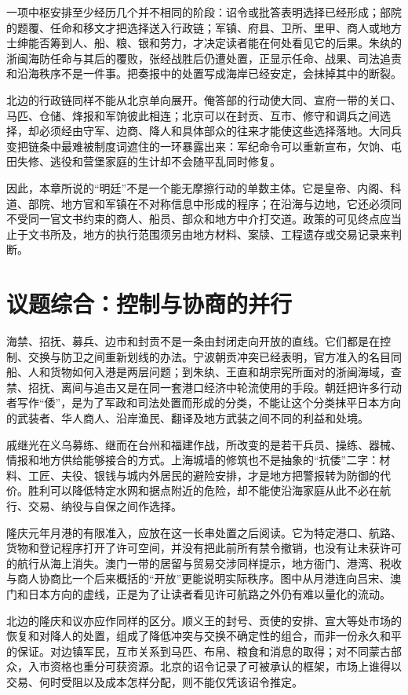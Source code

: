 一项中枢安排至少经历几个并不相同的阶段：诏令或批答表明选择已经形成；部院的题覆、任命和移文才把选择送入行政链；军镇、府县、卫所、里甲、商人或地方士绅能否筹到人、船、粮、银和劳力，才决定读者能在何处看见它的后果。朱纨的浙闽海防任命与其后的覆败，张经战胜后仍遭处置，正显示任命、战果、司法追责和沿海秩序不是一件事。把奏报中的处置写成海岸已经安定，会抹掉其中的断裂。

北边的行政链同样不能从北京单向展开。俺答部的行动使大同、宣府一带的关口、马匹、仓储、烽报和军饷彼此相连；北京可以在封贡、互市、修守和调兵之间选择，却必须经由守军、边商、降人和具体部众的往来才能使这些选择落地。大同兵变把链条中最难被制度词遮住的一环暴露出来：军纪命令可以重新宣布，欠饷、屯田失修、逃役和营堡家庭的生计却不会随平乱同时修复。

因此，本章所说的“明廷”不是一个能无摩擦行动的单数主体。它是皇帝、内阁、科道、部院、地方官和军镇在不对称信息中形成的程序；在沿海与边地，它还必须同不受同一官文书约束的商人、船员、部众和地方中介打交道。政策的可见终点应当止于文书所及，地方的执行范围须另由地方材料、案牍、工程遗存或交易记录来判断。

\section{议题综合：控制与协商的并行}

海禁、招抚、募兵、边市和封贡不是一条由封闭走向开放的直线。它们都是在控制、交换与防卫之间重新划线的办法。宁波朝贡冲突已经表明，官方准入的名目同船、人和货物如何入港是两层问题；到朱纨、王直和胡宗宪所面对的浙闽海域，查禁、招抚、离间与追击又是在同一套港口经济中轮流使用的手段。朝廷把许多行动者写作“倭”，是为了军政和司法处置而形成的分类，不能让这个分类抹平日本方向的武装者、华人商人、沿岸渔民、翻译及地方武装之间不同的利益和处境。

戚继光在义乌募练、继而在台州和福建作战，所改变的是若干兵员、操练、器械、情报和地方供给能够接合的方式。上海城墙的修筑也不是抽象的“抗倭”二字：材料、工匠、夫役、银钱与城内外居民的避险安排，才是地方把警报转为防御的代价。胜利可以降低特定水网和据点附近的危险，却不能使沿海家庭从此不必在航行、交易、纳役与自保之间作选择。

隆庆元年月港的有限准入，应放在这一长串处置之后阅读。它为特定港口、航路、货物和登记程序打开了许可空间，并没有把此前所有禁令撤销，也没有让未获许可的航行从海上消失。澳门一带的居留与贸易交涉同样提示，地方衙门、港湾、税收与商人协商比一个后来概括的“开放”更能说明实际秩序。图中从月港连向吕宋、澳门和日本方向的虚线，正是为了让读者看见许可航路之外仍有难以量化的流动。

北边的隆庆和议亦应作同样的区分。顺义王的封号、贡使的安排、宣大等处市场的恢复和对降人的处置，组成了降低冲突与交换不确定性的组合，而非一份永久和平的保证。对边镇军民，互市关系到马匹、布帛、粮食和消息的取得；对不同蒙古部众，入市资格也重分可获资源。北京的诏令记录了可被承认的框架，市场上谁得以交易、何时受阻以及成本怎样分配，则不能仅凭该诏令推定。


